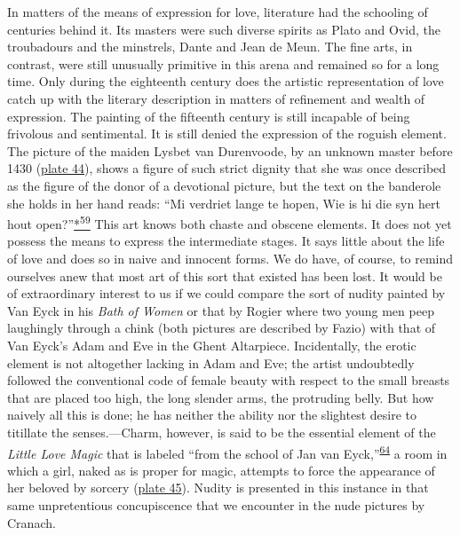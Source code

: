 In matters of the means of expression for love, literature had the
schooling of centuries behind it. Its masters were such diverse spirits
as Plato and Ovid, the troubadours and the minstrels, Dante and Jean de
Meun. The fine arts, in contrast, were still unusually primitive in this
arena and remained so for a long time. Only during the eighteenth
century does the artistic representation of love catch up with the
literary description in matters of refinement and wealth of expression.
The painting of the fifteenth century is still incapable of being
frivolous and sentimental. It is still denied the expression of the
roguish element. The picture of the maiden Lysbet van Durenvoode, by an
unknown master before 1430
(\protect\hyperlink{20_ILLUSTRATIONS_FOLLOW_PAGE.xhtmlux5cux23id_39}{plate
44}), shows a figure of such strict dignity that she was once described
as the figure of the donor of a devotional picture, but the text on the
banderole she holds in her hand reads: ``Mi verdriet lange te hopen,
\protect\hypertarget{21_Chapter_Thirteen__IMAGE_AND_WORD.xhtmlux5cux23page_373}{}{}Wie
is hi die syn hert hout
open?''\protect\hypertarget{21_Chapter_Thirteen__IMAGE_AND_WORD.xhtmlux5cux23id_2835}{\protect\hyperlink{23_NOTES.xhtmlux5cux23id_2836}{*\textsuperscript{59}}}
This art knows both chaste and obscene elements. It does not yet possess
the means to express the intermediate stages. It says little about the
life of love and does so in naive and innocent forms. We do have, of
course, to remind ourselves anew that most art of this sort that existed
has been lost. It would be of extraordinary interest to us if we could
compare the sort of nudity painted by Van Eyck in his \emph{Bath of
Women} or that by Rogier where two young men peep laughingly through a
chink (both pictures are described by Fazio) with that of Van Eyck's
Adam and Eve in the Ghent Altarpiece. Incidentally, the erotic element
is not altogether lacking in Adam and Eve; the artist undoubtedly
followed the conventional code of female beauty with respect to the
small breasts that are placed too high, the long slender arms, the
protruding belly. But how naively all this is done; he has neither the
ability nor the slightest desire to titillate the senses.---Charm,
however, is said to be the essential element of the \emph{Little Love
Magic} that is labeled ``from the school of Jan van
Eyck,''\textsuperscript{\protect\hypertarget{21_Chapter_Thirteen__IMAGE_AND_WORD.xhtmlux5cux23id_184}{\protect\hyperlink{23_NOTES.xhtmlux5cux23id_185}{64}}}
a room in which a girl, naked as is proper for magic, attempts to force
the appearance of her beloved by sorcery
(\protect\hyperlink{20_ILLUSTRATIONS_FOLLOW_PAGE.xhtmlux5cux23id_40}{plate
45}). Nudity is presented in this instance in that same unpretentious
concupiscence that we encounter in the nude pictures by Cranach.

